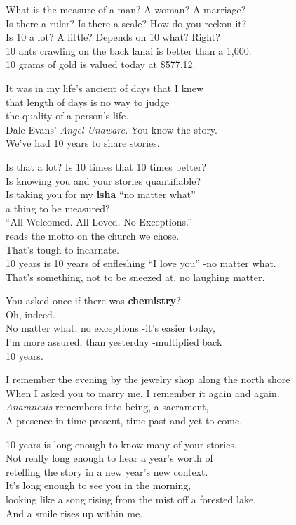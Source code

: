 \documentclass[
]{article}
\author{}
\date{}
\begin{document}
What is the measure of a man? A woman? A marriage?\\
Is there a ruler? Is there a scale? How do you reckon it?\\
Is 10 a lot? A little? Depends on 10 what? Right?\\
10 ants crawling on the back lanai is better than a 1,000.\\
10 grams of gold is valued today at \$577.12.

It was in my life's ancient of days that I knew\\
that length of days is no way to judge\\
the quality of a person's life.\\
Dale Evans' \emph{Angel Unaware.} You know the story.\\
We've had 10 years to share stories.

Is that a lot? Is 10 times that 10 times better?\\
Is knowing you and your stories quantifiable?\\
Is taking you for my \textbf{isha} ``no matter what''\\
a thing to be measured?\\
``All Welcomed. All Loved. No Exceptions.''\\
reads the motto on the church we chose.\\
That's tough to incarnate.\\
10 years is 10 years of enfleshing ``I love you'' -no matter what.\\
That's something, not to be sneezed at, no laughing matter.

You asked once if there was \textbf{chemistry}?\\
Oh, indeed.\\
No matter what, no exceptions -it's easier today,\\
I'm more assured, than yesterday -multiplied back\\
10 years.

I remember the evening by the jewelry shop along the north shore\\
When I asked you to marry me. I remember it again and again.\\
\emph{Anamnesis} remembers into being, a sacrament,\\
A presence in time present, time past and yet to come.

10 years is long enough to know many of your stories.\\
Not really long enough to hear a year's worth of\\
retelling the story in a new year's new context.\\
It's long enough to see you in the morning,\\
looking like a song rising from the mist off a forested lake.\\
And a smile rises up within me.
\end{document}
